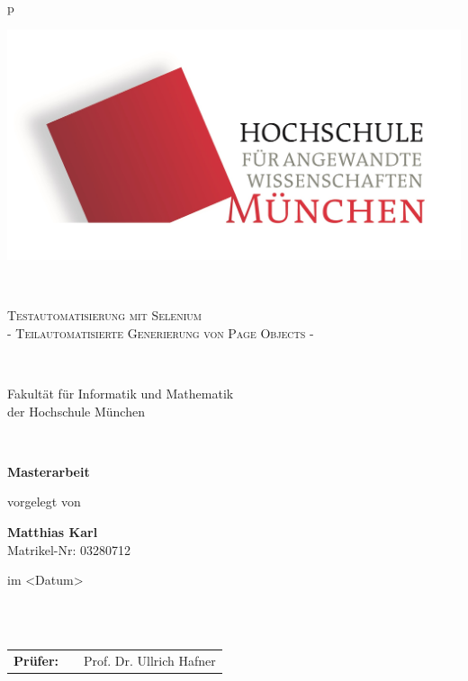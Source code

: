 \begin{center}
\begin{tabular}{p{\textwidth}}


\begin{center}
\includegraphics[scale=0.17]{img/logos.jpg}
\end{center}


\\

\begin{center}
\LARGE{\textsc{
Testautomatisierung mit Selenium \\  \large{- Teilautomatisierte Generierung von Page Objects -}
}}
\end{center}

\\


\begin{center}
\large{Fakultät für Informatik und Mathematik \\
der Hochschule München \\}
\end{center}

\\

\begin{center}
\textbf{\Large{Masterarbeit}}
\end{center}



\begin{center}
vorgelegt von
\end{center}

\begin{center}
\large{\textbf{Matthias Karl}} \\
\large{Matrikel-Nr: 03280712} \\
\end{center}

\begin{center}
\large{im <Datum>}
\end{center}

\\

\\

\begin{center}
\begin{tabular}{lll}
\textbf{Prüfer:} & & Prof. Dr. Ullrich Hafner\\
\end{tabular}
\end{center}

\end{tabular}
\end{center}